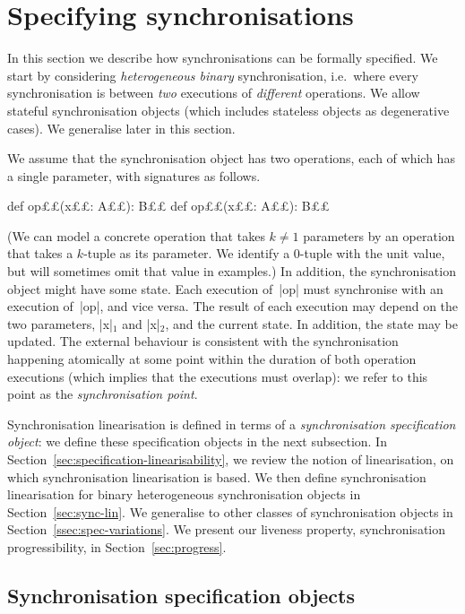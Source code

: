 \section{Specifying synchronisations}
\label{sec:spec}

In this section we describe how synchronisations can be formally specified.
We start by considering \emph{heterogeneous binary} synchronisation,
i.e.~where every synchronisation is between \emph{two} executions of
\emph{different} operations.  We allow stateful synchronisation objects (which
includes stateless objects as degenerative cases).  We generalise later in
this section.


We assume that the synchronisation object has two operations, each of which
has a single parameter, with signatures as follows.
%
\begin{scala}
def op££(x££: A££): B££
def op££(x££: A££): B££
\end{scala}
%
(We can model a concrete operation that takes $k \ne 1$ parameters by an
operation that takes a $k$-tuple as its parameter.  We identify a 0-tuple with
the unit value, but will sometimes omit that value in examples.)
%
In addition, the synchronisation object might have some state.
Each execution of~|op| must synchronise with an execution of~|op|, and
vice versa.  The result of each execution may depend on the two parameters,
|x|$_1$ and |x|$_2$, and the current state.  In addition, the state may be
updated.  The external behaviour is consistent with the synchronisation
happening atomically at some point within the duration of both operation
executions (which implies that the executions must overlap): we refer to this
point as the \emph{synchronisation point}.

Synchronisation linearisation is defined in terms of a \emph{synchronisation
  specification object}: we define these specification objects in the next
subsection.  In Section~\ref{sec:specification-linearisability}, we review the
notion of linearisation, on which synchronisation linearisation is based.  We
then define synchronisation linearisation for binary heterogeneous
synchronisation objects in Section~\ref{sec:sync-lin}.  We generalise to other
classes of synchronisation objects in Section~\ref{ssec:spec-variations}.  We
present our liveness property, synchronisation progressibility, in
Section~\ref{sec:progress}.


\subsection{Synchronisation specification objects}

